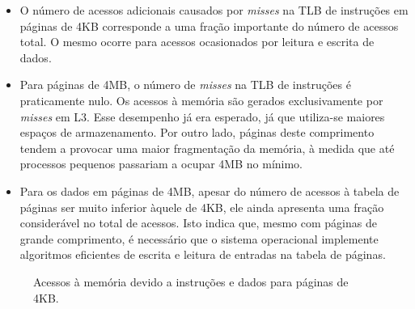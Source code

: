 \documentclass[12pt]{article}
\begin{document}
\begin{itemize}
  \item O número de acessos adicionais causados por \textit{misses} na TLB de
  instruções em páginas de 4KB corresponde a uma fração importante do número de
  acessos total. O mesmo ocorre para acessos ocasionados por leitura e escrita
  de dados.

  \item Para páginas de 4MB, o número de \textit{misses} na TLB de instruções é
  praticamente nulo. Os acessos à memória são gerados exclusivamente por
  \textit{misses} em L3. Esse desempenho já era esperado, já que utiliza-se
  maiores espaços de armazenamento. Por outro lado, páginas deste comprimento
  tendem a provocar uma maior fragmentação da memória, à medida que até
  processos pequenos passariam a ocupar 4MB no mínimo.

  \item Para os dados em páginas de 4MB, apesar do número de acessos à tabela de
  páginas ser muito inferior àquele de 4KB, ele ainda apresenta uma fração
  considerável no total de acessos. Isto indica que, mesmo com páginas de grande
  comprimento, é necessário que o sistema operacional implemente algoritmos
  eficientes de escrita e leitura de entradas na tabela de páginas.
\end{itemize}

\begin{figure}[h]
  \centering
  \hfill
  \caption{Acessos à memória devido a instruções e dados para páginas de 4KB.}
\end{figure}
  
\end{document}
